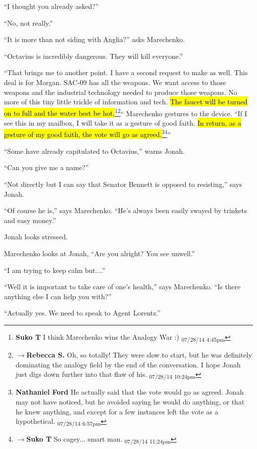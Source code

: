 ``I thought you already asked?''

``No, not really.''

``It is more than not siding with Anglia?'' asks Marechenko.

``Octavius is incredibly dangerous.  They will kill everyone.''

``That brings me to another point.  I have a second request to make as well.  This deal is for Morgan.  SAC-09 has all the weapons.  We want access to those weapons and the industrial technology needed to produce those weapons.  No more of this tiny little trickle of information and tech.  \hl{The faucet will be turned on to full and the water best be hot.}\footnote{\textbf{Suko T }I think Marechenko wins the Analogy War :) \textsubscript{07/28/14 4:45pm}}\footnote{$\rightarrow$\textbf{Rebecca S. }Oh, so totally! They were slow to start, but he was definitely dominating the analogy field by the end of the conversation.  I hope Jonah just digs down further into that flaw of his. \textsubscript{07/28/14 10:24pm}}``  Marechenko gestures to the device.  ``If I see this in my mailbox, I will take it as a gesture of good faith.  \hl{In return, as a gesture of my good faith, the vote will go as agreed.}\footnote{\textbf{Nathaniel Ford }He actually said that the vote would go as agreed. Jonah may not have noticed, but he avoided saying he would do anything, or that he knew anything, and except for a few instances left the vote as a hypothetical. \textsubscript{07/28/14 6:57pm}}\footnote{$\rightarrow$\textbf{Suko T }So cagey... smart man. \textsubscript{07/28/14 11:24pm}}''

``Some have already capitulated to Octavius,'' warns Jonah.

``Can you give me a name?''

``Not directly but I can say that Senator Bennett is opposed to resisting,'' says Jonah.  

``Of course he is,'' says Marechenko.  ``He's always been easily swayed by trinkets and easy money.''

Jonah looks stressed.

Marechenko looks at Jonah, ``Are you alright?  You see unwell.''

``I am trying to keep calm but....''

``Well it is important to take care of one's health,'' says Marechenko.  ``Is there anything else I can help you with?''

``Actually yes.  We need to speak to Agent Lorentz.''

